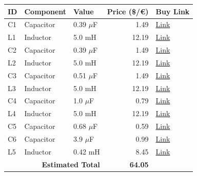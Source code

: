 \begin{table}[H]
    \centering
    \renewcommand{\arraystretch}{1.5}
    \begin{tabular}{@{}lllrl@{}}
        \toprule
        \textbf{ID} & \textbf{Component} & \textbf{Value} & \textbf{Price (\$/€)} & \textbf{Buy Link} \\
        \midrule
        C1 & Capacitor & 0.39 $\mu$F & 1.49 & \href{https://www.soundimports.eu/en/jantzen-audio-001-0216.html}{Link} \\
        L1 & Inductor & 5.0 mH & 12.19 & \href{https://www.parts-express.com/Dayton-Audio-IC185-5.0mH-18-AWG-Laminated-Iron-Core-Inductor-257-668}{Link} \\
        C2 & Capacitor & 0.39 $\mu$F & 1.49 & \href{https://www.soundimports.eu/en/jantzen-audio-001-0216.html}{Link} \\
        L2 & Inductor & 5.0 mH & 12.19 & \href{https://www.parts-express.com/Dayton-Audio-IC185-5.0mH-18-AWG-Laminated-Iron-Core-Inductor-257-668}{Link} \\
        C3 & Capacitor & 0.51 $\mu$F & 1.49 & \href{https://www.soundimports.eu/en/jantzen-audio-001-0222.html}{Link} \\
        L3 & Inductor & 5.0 mH & 12.19 & \href{https://www.parts-express.com/Dayton-Audio-IC185-5.0mH-18-AWG-Laminated-Iron-Core-Inductor-257-668}{Link} \\
        C4 & Capacitor & 1.0 $\mu$F & 0.79 & \href{https://www.parts-express.com/Dayton-Audio-PMPC-1.0-1.0uF-250V-Precision-Audio-Capacitor-027-210}{Link} \\
        L4 & Inductor & 5.0 mH & 12.19 & \href{https://www.parts-express.com/Dayton-Audio-IC185-5.0mH-18-AWG-Laminated-Iron-Core-Inductor-257-668}{Link} \\
        C5 & Capacitor & 0.68 $\mu$F & 0.59 & \href{https://www.parts-express.com/Dayton-Audio-DMPC-0.68-0.68uF-250V-Polypropylene-Capacitor-027-408}{Link} \\
        C6 & Capacitor & 3.9 $\mu$F & 0.99 & \href{https://www.soundimports.eu/en/jantzen-audio-001-6020.html}{Link} \\
        L5 & Inductor & 0.42 mH & 8.45 & \href{https://www.soundimports.eu/en/jantzen-audio-000-1577.html}{Link} \\
        \midrule
        \multicolumn{3}{r}{\textbf{Estimated Total}} & \textbf{64.05} & \\
        \bottomrule
    \end{tabular}
\end{table}
